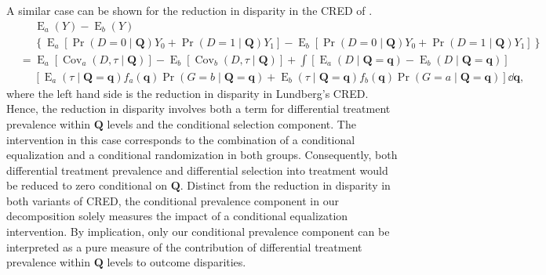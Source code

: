 \documentclass[12pt,a4paper]{article}
\newcommand{\Cov}{\operatorname{Cov}}
\newcommand{\E}{\operatorname{E}}
\def\Q{{\boldsymbol Q}}
\def\q{{\boldsymbol q}}
\DeclareMathOperator{\Pro}{Pr}
\begin{document}
A similar case can be shown for the reduction in disparity in the CRED of \citet{lundberg_gap-closing_2022}.
\begin{align}
&\phantom{{}={}} \E_a(Y)-\E_b(Y) \nonumber \\ 
&\phantom{{}={}} \left\lbrace \E_a[\Pro(D=0 \mid \Q) Y_0 + \Pro(D=1 \mid \Q) Y_1] - \E_b[\Pro(D=0 \mid \Q) Y_0 + \Pro(D=1 \mid \Q) Y_1] \right\rbrace \nonumber \\
&= \E_a[\Cov_a(D,\tau \mid \Q)] - \E_b[\Cov_b(D,\tau \mid \Q)] + \int [\E_a(D \mid \Q=\q) - \E_b(D \mid \Q=\q)] \nonumber \\
&\phantom{{}={}} [\E_a(\tau \mid \Q=\q)f_a(\q)\Pro(G=b \mid \Q=\q) + \E_b(\tau \mid \Q=\q)f_b(\q)\Pro(G=a \mid \Q=\q)] \dd \q,
\end{align}
where the left hand side is the reduction in disparity in Lundberg's CRED. Hence, the reduction in disparity involves both a term for differential treatment prevalence within $\Q$ levels and the conditional selection component. The intervention in this case corresponds to the combination of a conditional equalization and a conditional randomization in both groups. Consequently, both differential treatment prevalence and differential selection into treatment would be reduced to zero conditional on $\Q$. Distinct from the reduction in disparity in both variants of CRED, the conditional prevalence component in our decomposition solely measures the impact of a conditional equalization intervention. By implication, only our conditional prevalence component can be interpreted as a pure measure of the contribution of differential treatment prevalence within $\Q$ levels to  outcome disparities. 
\end{document}
